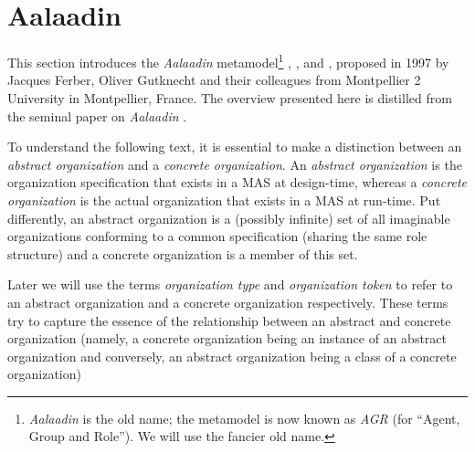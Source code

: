 
\section{Aalaadin}

This section introduces the \textit{Aalaadin} metamodel\footnote{\textit{Aalaadin} is the old name; the metamodel is now known as \textit{AGR} (for ``Agent, Group and Role''). We will use the fancier old name.} \cite{Ferber97}, \cite{Ferber98}, \cite{Ferber00} and \cite{Ferber03}, proposed in 1997 by Jacques Ferber, Oliver Gutknecht and their colleagues from Montpellier 2 University in Montpellier, France.
The overview presented here is distilled from the seminal paper on \textit{Aalaadin} \cite{Ferber97}.


To understand the following text, it is essential to make a distinction between an \textit{abstract organization} and a \textit{concrete organization}.
An \textit{abstract organization} is the organization specification that exists in a MAS at design-time, whereas a \textit{concrete organization} is the actual organization that exists in a MAS at run-time.
Put differently, an abstract organization is a (possibly infinite) set of all imaginable organizations conforming to a common specification (sharing the same role structure) and a concrete organization is a member of this set.

Later we will use the terms \textit{organization type} and \textit{organization token} to refer to an abstract organization and a concrete organization respectively.
These terms try to capture the essence of the relationship between an abstract and concrete organization (namely, a concrete organization being an instance of an abstract organization and conversely, an abstract organization being a class of a concrete organization)

